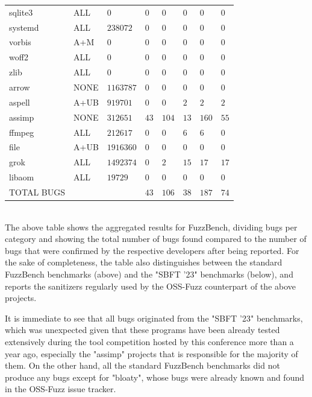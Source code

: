 \begin{adjustbox}{width=\textwidth,center}
\begin{tabular}{|l|l|l|l|l|l|l|l|}
sqlite3   &ALL   &$0$   &$0$   &$0$   &$0$   &$0$   &$0$ \\
systemd   &ALL   &$238072$   &$0$   &$0$   &$0$   &$0$   &$0$ \\
vorbis   &A+M   &$0$   &$0$   &$0$   &$0$   &$0$   &$0$ \\
woff2   &ALL   &$0$   &$0$   &$0$   &$0$   &$0$   &$0$ \\
zlib   &ALL   &$0$   &$0$   &$0$   &$0$   &$0$   &$0$ \\
\hline
arrow   &NONE   &$1163787$   &$0$   &$0$   &$0$   &$0$   &$0$ \\
aspell   &A+UB   &$919701$   &$0$   &$0$   &$2$   &$2$   &$2$ \\
assimp   &NONE   &$312651$   &$43$   &$104$   &$13$   &$160$   &$55$ \\
ffmpeg   &ALL   &$212617$   &$0$   &$0$   &$6$   &$6$   &$0$ \\
file   &A+UB   &$1916360$   &$0$   &$0$   &$0$   &$0$   &$0$ \\
grok   &ALL   &$1492374$   &$0$   &$2$   &$15$   &$17$   &$17$ \\
libaom   &ALL   &$19729$   &$0$   &$0$   &$0$   &$0$   &$0$ \\
\hline
TOTAL BUGS   &   &   &$43$   &$106$   &$38$   &$187$   &$74$          \\
\hline
\end{tabular}
\end{adjustbox}{}
\ \\ 

The above table shows the aggregated results for FuzzBench, dividing bugs per category and showing the total number of bugs found compared to the number of bugs that were confirmed by the respective developers after being reported. For the sake of completeness, the table also distinguishes between the standard FuzzBench benchmarks (above) and the "SBFT '23" benchmarks (below), and reports the sanitizers regularly used by the OSS-Fuzz counterpart of the above projects.

It is immediate to see that all bugs originated from the "SBFT '23" benchmarks, which was unexpected given that these programs have been already tested extensively during the tool competition hosted by this conference more than a year ago, especially the "assimp" projects that is responsible for the majority of them. On the other hand, all the standard FuzzBench benchmarks did not produce any bugs except for "bloaty", whose bugs were already known and found in the OSS-Fuzz issue tracker.

